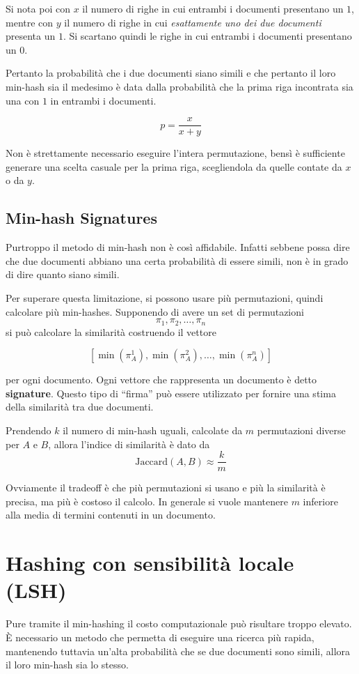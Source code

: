 		Si nota poi con $x$ il numero di righe in cui entrambi i documenti presentano un $1$, mentre con $y$ il numero di righe in cui \textit{esattamente uno dei due documenti} presenta un $1$. Si scartano quindi le righe in cui entrambi i documenti presentano un $0$.

		Pertanto la probabilità che i due documenti siano simili e che pertanto il loro min-hash sia il medesimo è data dalla probabilità che la prima riga incontrata sia una con $1$ in entrambi i documenti.

		$$ p = \frac{x}{x + y} $$

		\begin{remark}
			Non è strettamente necessario eseguire l'intera permutazione, bensì è sufficiente generare una scelta casuale per la prima riga, scegliendola da quelle contate da $x$ o da $y$.
		\end{remark}

			\subsection{Min-hash Signatures}
				Purtroppo il metodo di min-hash non è così affidabile. Infatti sebbene possa dire che due documenti abbiano una certa probabilità di essere simili, non è in grado di dire quanto siano simili.

				Per superare questa limitazione, si possono usare più permutazioni, quindi calcolare più min-hashes. Supponendo di avere un set di permutazioni 
				$$\pi_1, \pi_2, \dots, \pi_n$$
				si può calcolare la similarità costruendo il vettore

				$$ \left[ \min(\pi_A^1), \min(\pi_A^2), \dots, \min(\pi_A^n) \right] $$

				per ogni documento. Ogni vettore che rappresenta un documento è detto \textbf{signature}. Questo tipo di ``firma'' può essere utilizzato per fornire una stima della similarità tra due documenti.

				Prendendo $k$ il numero di min-hash uguali, calcolate da $m$ permutazioni diverse per $A$ e $B$, allora l'indice di similarità è dato da
				$$ \text{Jaccard}(A, B) \approx \frac{k}{m} $$

				Ovviamente il tradeoff è che più permutazioni si usano e più la similarità è precisa, ma più è costoso il calcolo. In generale si vuole mantenere $m$ inferiore alla media di termini contenuti in un documento.

	\section{Hashing con sensibilità locale (LSH)}
		Pure tramite il min-hashing il costo computazionale può risultare troppo elevato. È necessario un metodo che permetta di eseguire una ricerca più rapida, mantenendo tuttavia un'alta probabilità che se due documenti sono simili, allora il loro min-hash sia lo stesso.

